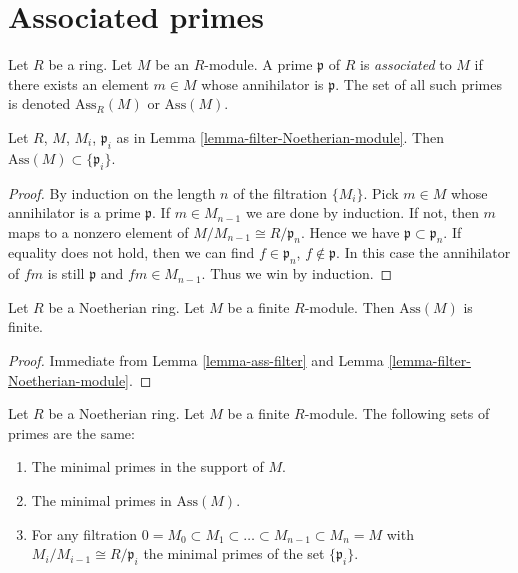 \section{Associated primes}
\label{section-ass}

\begin{definition}
\label{definition-associated}
Let $R$ be a ring. Let $M$ be an $R$-module.
A prime $\mathfrak p$ of $R$ is {\it associated} to $M$
if there exists an element $m \in M$ whose annihilator
is $\mathfrak p$.
The set of all such primes is denoted $\text{Ass}_R(M)$
or $\text{Ass}(M)$.
\end{definition}

\begin{lemma}
\label{lemma-ass-filter}
Let $R$, $M$, $M_i$, $\mathfrak p_i$ as in
Lemma \ref{lemma-filter-Noetherian-module}.
Then $\text{Ass}(M) \subset \{\mathfrak p_i\}$.
\end{lemma}

\begin{proof}
By induction on the length $n$ of the filtration $\{ M_i \}$.
Pick $m \in M$ whose annihilator is a prime $\mathfrak p$.
If $m \in M_{n-1}$ we are done by induction. If not,
then $m$ maps to a nonzero element of $M/M_{n-1} \cong
R/\mathfrak p_n$. Hence we have $\mathfrak p \subset \mathfrak p_n$.
If equality does not hold, then we can find $f \in \mathfrak p_n$,
$f \not\in \mathfrak p$. In this case the annihilator of $fm$ is still
$\mathfrak p$ and $fm \in M_{n-1}$. Thus we win by induction.
\end{proof}

\begin{lemma}
\label{lemma-finite-ass}
Let $R$ be a Noetherian ring.
Let $M$ be a finite $R$-module.
Then $\text{Ass}(M)$ is finite.
\end{lemma}

\begin{proof}
Immediate from Lemma \ref{lemma-ass-filter} and
Lemma \ref{lemma-filter-Noetherian-module}.
\end{proof}

\begin{proposition}
Let $R$ be a Noetherian ring.
Let $M$ be a finite $R$-module.
The following sets of primes are the same:
\begin{enumerate}
\item The minimal primes in the support of $M$.
\item The minimal primes in $\text{Ass}(M)$.
\item For any filtration $0 = M_0 \subset M_1 \subset \ldots
\subset M_{n-1} \subset M_n = M$ with $M_i/M_{i-1} \cong R/\mathfrak p_i$
the minimal primes of the set $\{\mathfrak p_i\}$.
\end{enumerate}
\end{proposition}


